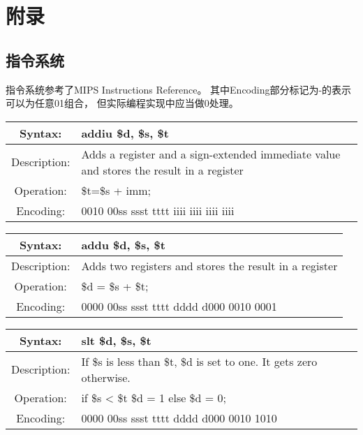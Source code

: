 \section{附录}
    \subsection{指令系统}
    指令系统参考了MIPS Instructions Reference。%
    其中Encoding部分标记为-的表示可以为任意01组合，%
    但实际编程实现中应当做0处理。

    \begin{table}[!hbp]
    \begin{tabularx}{\textwidth}{|c|X|}
        \hline
        Syntax: & addiu \$d, \$s, \$t \\
        \hline
        Description: & Adds a register and a sign-extended immediate value and stores the result in a register \\
        \hline
        Operation: & \$t=\$s + imm; \\
        \hline
        Encoding: & 0010 00ss ssst tttt iiii iiii iiii iiii \\
        \hline
    \end{tabularx}
    \end{table}

    \begin{table}[!hbp]
    \begin{tabularx}{\textwidth}{|c|X|}
        \hline
        Syntax: & addu \$d, \$s, \$t \\
        \hline
        Description: & Adds two registers and stores the result in a register \\
        \hline
        Operation: & \$d = \$s + \$t; \\
        \hline
        Encoding: & 0000 00ss ssst tttt dddd d000 0010 0001 \\
        \hline
    \end{tabularx}
    \end{table}

    
    \begin{table}[!hbp]
    \begin{tabularx}{\textwidth}{|c|X|}
        \hline
        Syntax: & slt \$d, \$s, \$t \\
        \hline
        Description: & If \$s is less than \$t, \$d is set to one. It gets zero otherwise. \\
        \hline
        Operation: & if \$s < \$t \$d = 1 else \$d = 0; \\
        \hline
        Encoding: & 0000 00ss ssst tttt dddd d000 0010 1010 \\
        \hline
    \end{tabularx}
    \end{table}

